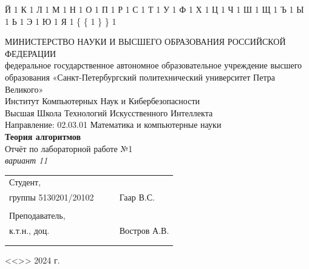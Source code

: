 \documentclass[a4paper, final]{article}
\begin{document}
{  {Й}{ {\selectfont{}} }1
  {К}{ {\selectfont{}} }1
  {Л}{ {\selectfont{}} }1
  {М}{ {\selectfont{}} }1
  {Н}{ {\selectfont{}} }1
  {О}{ {\selectfont{}} }1
  {П}{ {\selectfont{}} }1
  {Р}{ {\selectfont{}} }1
  {С}{ {\selectfont{}} }1
  {Т}{ {\selectfont{}} }1
  {У}{ {\selectfont{}} }1
  {Ф}{ {\selectfont{}} }1
  {Х}{ {\selectfont{}} }1
  {Ц}{ {\selectfont{}} }1
  {Ч}{ {\selectfont{}} }1
  {Ш}{ {\selectfont{}} }1
  {Щ}{ {\selectfont{}} }1
  {Ъ}{ {\selectfont{}} }1
  {Ы}{ {\selectfont{}} }1
  {Ь}{ {\selectfont{}} }1
  {Э}{ {\selectfont{}} }1
  {Ю}{ {\selectfont{}} }1
  {Я}{ {\selectfont{}} }1
  {\{}{ { {\color{brackets}\{} } }1 %
  {\} }{ { {\color{brackets}\} } } }1 %
}

\begin{center}
\hfill \break
\hfill \break
\normalsize{МИНИСТЕРСТВО НАУКИ И ВЫСШЕГО ОБРАЗОВАНИЯ РОССИЙСКОЙ ФЕДЕРАЦИИ\\
 федеральное государственное автономное образовательное учреждение высшего образования «Санкт-Петербургский политехнический университет Петра Великого»\\[5pt]}
\normalsize{Институт Компьютерных Наук и Кибербезопасности}\\[5pt] 
\normalsize{Высшая Школа Технологий Искусственного Интеллекта}\\[5pt] 
\normalsize{Направление: 02.03.01 Математика и компьютерные науки}\\

\hfill \break
\hfill \break
\hfill \break
\large{\textbf{Теория алгоритмов}}\\
\large{Отчёт по лабораторной работе №1}\\
\large{\textit{вариант 11\\}}

\hfill \break
\hfill \break
\end{center}
 
\small{ 
\begin{tabular}{lrrl}
\!\!\!Студент, & \hspace{2cm} & & \\
\!\!\!группы 5130201/20102 & \hspace{2cm} & \underline{\hspace{3cm}} &Гаар В.С. \\\\
\!\!\!Преподаватель, \hspace{2cm} & & \\
\!\!\!к.т.н., доц. & \hspace{2cm} & \underline{\hspace{3cm}} &  Востров А.В. \\\\
&&\hspace{5cm}
\end{tabular}
\begin{flushright}
<<\underline{\hspace{1cm}}>>\underline{\hspace{2.5cm}} 2024 г.
\end{flushright}
}
\end{document}
